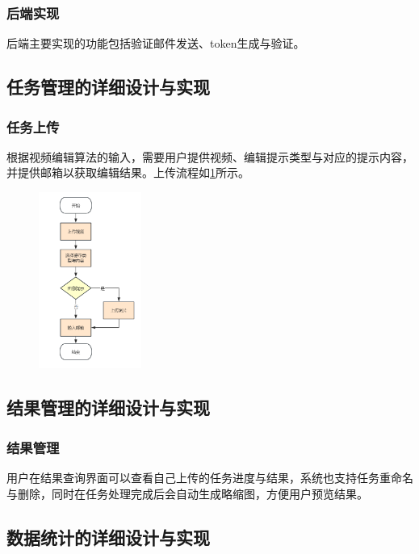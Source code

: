 \subsubsection{后端实现}

后端主要实现的功能包括验证邮件发送、token生成与验证。

\subsection{任务管理的详细设计与实现}

\subsubsection{任务上传}

根据视频编辑算法的输入，需要用户提供视频、编辑提示类型与对应的提示内容，并提供邮箱以获取编辑结果。上传流程如\ref{fig:upload_process}所示。
\begin{figure}[ht]
    \centering
    \includegraphics[width=0.3\textwidth]{source/img/edit_process.png}
    \label{fig:upload_process}
\end{figure}

\subsection{结果管理的详细设计与实现}

\subsubsection{结果管理}

用户在结果查询界面可以查看自己上传的任务进度与结果，系统也支持任务重命名与删除，同时在任务处理完成后会自动生成略缩图，方便用户预览结果。

\subsection{数据统计的详细设计与实现}


